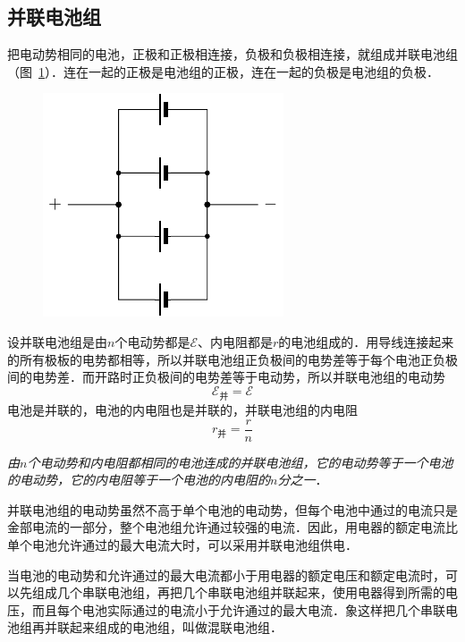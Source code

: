 \subsection{并联电池组}


把电动势相同的电池，正极和正极相连接，负极和负极相连接，就组成并联电池组（图~\ref{fig_B_7-35}）．连在一起的正极是电池组的正极，连在一起的负极是电池组的负极．
\begin{figure}[htbp]
    \centering
    \includegraphics{fig/B/7-35.pdf}
    \caption{}\label{fig_B_7-35}
\end{figure}

设并联电池组是由$n$个电动势都是$\mathcal{E}$、内电阻都是$r$的电池组成的．用导线连接起来的所有极板的电势都相等，所以并联电池组正负极间的电势差等于每个电池正负极间的电势差．而开路时正负极间的电势差等于电动势，所以并联电池组的电动势
\[\mathcal{E}_{\text{并}}=\mathcal{E} \]
电池是并联的，电池的内电阻也是并联的，并联电池组的内电阻
\[r_{\text{并}}=\frac{r}{n} \]

\textit{由$n$个电动势和内电阻都相同的电池连成的并联电池组，它的电动势等于一个电池的电动势，它的内电阻等于一个电池的内电阻的$n$分之一}．

并联电池组的电动势虽然不高于单个电池的电动势，但每个电池中通过的电流只是金部电流的一部分，整个电池组允许通过较强的电流．因此，用电器的额定电流比单个电池允许通过的最大电流大时，可以采用并联电池组供电．

当电池的电动势和允许通过的最大电流都小于用电器的额定电压和额定电流时，可以先组成几个串联电池组，再把几个串联电池组并联起来，使用电器得到所需的电压，而且每个电池实际通过的电流小于允许通过的最大电流．象这样把几个串联电池组再并联起来组成的电池组，叫做混联电池组．


